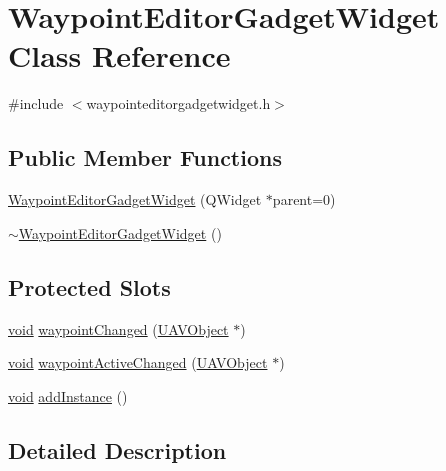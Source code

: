 \hypertarget{class_waypoint_editor_gadget_widget}{\section{\-Waypoint\-Editor\-Gadget\-Widget \-Class \-Reference}
\label{class_waypoint_editor_gadget_widget}
}


{\ttfamily \#include $<$waypointeditorgadgetwidget.\-h$>$}

\subsection*{\-Public \-Member \-Functions}
\begin{DoxyCompactItemize}
\item 
\hyperlink{group___waypoint_editor_gadget_plugin_gaed1892bdb06fd69b9efd71f0490b6865}{\-Waypoint\-Editor\-Gadget\-Widget} (\-Q\-Widget $\ast$parent=0)
\item 
\hyperlink{group___waypoint_editor_gadget_plugin_ga6384204fc4ea3baac3ef034bec3ffd2e}{$\sim$\-Waypoint\-Editor\-Gadget\-Widget} ()
\end{DoxyCompactItemize}
\subsection*{\-Protected \-Slots}
\begin{DoxyCompactItemize}
\item 
\hyperlink{group___u_a_v_objects_plugin_ga444cf2ff3f0ecbe028adce838d373f5c}{void} \hyperlink{group___waypoint_editor_gadget_plugin_gaf94d2aa5249b20561783e93b04428875}{waypoint\-Changed} (\hyperlink{class_u_a_v_object}{\-U\-A\-V\-Object} $\ast$)
\item 
\hyperlink{group___u_a_v_objects_plugin_ga444cf2ff3f0ecbe028adce838d373f5c}{void} \hyperlink{group___waypoint_editor_gadget_plugin_ga3f3ab4714a439f9a90e34a03506a4f38}{waypoint\-Active\-Changed} (\hyperlink{class_u_a_v_object}{\-U\-A\-V\-Object} $\ast$)
\item 
\hyperlink{group___u_a_v_objects_plugin_ga444cf2ff3f0ecbe028adce838d373f5c}{void} \hyperlink{group___waypoint_editor_gadget_plugin_ga1cdc4fa0f69ba28ea67dc549588c0cf6}{add\-Instance} ()
\end{DoxyCompactItemize}


\subsection{\-Detailed \-Description}


